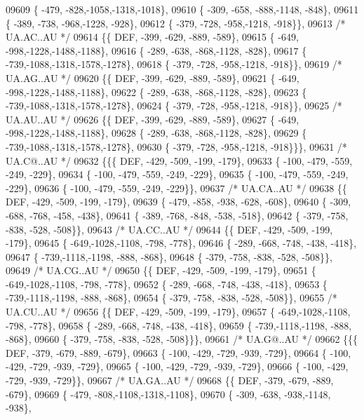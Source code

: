 \begin{DoxyCode}
09609 \{ -479, -828,-1058,-1318,-1018\},
09610 \{ -309, -658, -888,-1148, -848\},
09611 \{ -389, -738, -968,-1228, -928\},
09612 \{ -379, -728, -958,-1218, -918\}\},
09613 \textcolor{comment}{/* UA.AC..AU */}
09614 \{\{  DEF, -399, -629, -889, -589\},
09615 \{ -649, -998,-1228,-1488,-1188\},
09616 \{ -289, -638, -868,-1128, -828\},
09617 \{ -739,-1088,-1318,-1578,-1278\},
09618 \{ -379, -728, -958,-1218, -918\}\},
09619 \textcolor{comment}{/* UA.AG..AU */}
09620 \{\{  DEF, -399, -629, -889, -589\},
09621 \{ -649, -998,-1228,-1488,-1188\},
09622 \{ -289, -638, -868,-1128, -828\},
09623 \{ -739,-1088,-1318,-1578,-1278\},
09624 \{ -379, -728, -958,-1218, -918\}\},
09625 \textcolor{comment}{/* UA.AU..AU */}
09626 \{\{  DEF, -399, -629, -889, -589\},
09627 \{ -649, -998,-1228,-1488,-1188\},
09628 \{ -289, -638, -868,-1128, -828\},
09629 \{ -739,-1088,-1318,-1578,-1278\},
09630 \{ -379, -728, -958,-1218, -918\}\}\},
09631 \textcolor{comment}{/* UA.C@..AU */}
09632 \{\{\{  DEF, -429, -509, -199, -179\},
09633 \{ -100, -479, -559, -249, -229\},
09634 \{ -100, -479, -559, -249, -229\},
09635 \{ -100, -479, -559, -249, -229\},
09636 \{ -100, -479, -559, -249, -229\}\},
09637 \textcolor{comment}{/* UA.CA..AU */}
09638 \{\{  DEF, -429, -509, -199, -179\},
09639 \{ -479, -858, -938, -628, -608\},
09640 \{ -309, -688, -768, -458, -438\},
09641 \{ -389, -768, -848, -538, -518\},
09642 \{ -379, -758, -838, -528, -508\}\},
09643 \textcolor{comment}{/* UA.CC..AU */}
09644 \{\{  DEF, -429, -509, -199, -179\},
09645 \{ -649,-1028,-1108, -798, -778\},
09646 \{ -289, -668, -748, -438, -418\},
09647 \{ -739,-1118,-1198, -888, -868\},
09648 \{ -379, -758, -838, -528, -508\}\},
09649 \textcolor{comment}{/* UA.CG..AU */}
09650 \{\{  DEF, -429, -509, -199, -179\},
09651 \{ -649,-1028,-1108, -798, -778\},
09652 \{ -289, -668, -748, -438, -418\},
09653 \{ -739,-1118,-1198, -888, -868\},
09654 \{ -379, -758, -838, -528, -508\}\},
09655 \textcolor{comment}{/* UA.CU..AU */}
09656 \{\{  DEF, -429, -509, -199, -179\},
09657 \{ -649,-1028,-1108, -798, -778\},
09658 \{ -289, -668, -748, -438, -418\},
09659 \{ -739,-1118,-1198, -888, -868\},
09660 \{ -379, -758, -838, -528, -508\}\}\},
09661 \textcolor{comment}{/* UA.G@..AU */}
09662 \{\{\{  DEF, -379, -679, -889, -679\},
09663 \{ -100, -429, -729, -939, -729\},
09664 \{ -100, -429, -729, -939, -729\},
09665 \{ -100, -429, -729, -939, -729\},
09666 \{ -100, -429, -729, -939, -729\}\},
09667 \textcolor{comment}{/* UA.GA..AU */}
09668 \{\{  DEF, -379, -679, -889, -679\},
09669 \{ -479, -808,-1108,-1318,-1108\},
09670 \{ -309, -638, -938,-1148, -938\},

\end{DoxyCode}
